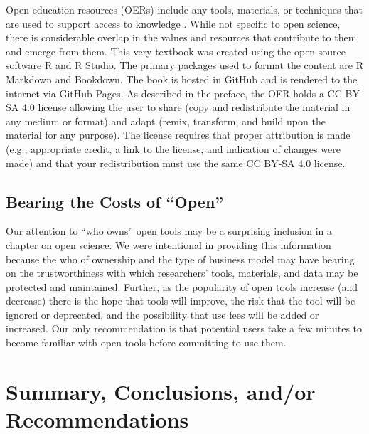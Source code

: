 \documentclass[
  11pt,
]{book}
\begin{document}
Open education resources (OERs) include any tools, materials, or techniques that are used to support access to knowledge \citep{bezjak_open_2018}. While not specific to open science, there is considerable overlap in the values and resources that contribute to them and emerge from them. This very textbook was created using the open source software R and R Studio. The primary packages used to format the content are R Markdown and Bookdown. The book is hosted in GitHub and is rendered to the internet via GitHub Pages. As described in the preface, the OER holds a CC BY-SA 4.0 license allowing the user to share (copy and redistribute the material in any medium or format) and adapt (remix, transform, and build upon the material for any purpose). The license requires that proper attribution is made (e.g., appropriate credit, a link to the license, and indication of changes were made) and that your redistribution must use the same CC BY-SA 4.0 license.

\hypertarget{bearing-the-costs-of-open}{%
\subsection{Bearing the Costs of ``Open''}\label{bearing-the-costs-of-open}}

Our attention to ``who owns'' open tools may be a surprising inclusion in a chapter on open science. We were intentional in providing this information because the who of ownership and the type of business model may have bearing on the trustworthiness with which researchers' tools, materials, and data may be protected and maintained. Further, as the popularity of open tools increase (and decrease) there is the hope that tools will improve, the risk that the tool will be ignored or deprecated, and the possibility that use fees will be added or increased. Our only recommendation is that potential users take a few minutes to become familiar with open tools before committing to use them.

\hypertarget{summary-conclusions-andor-recommendations}{%
\section{Summary, Conclusions, and/or Recommendations}\label{summary-conclusions-andor-recommendations}}
\end{document}
